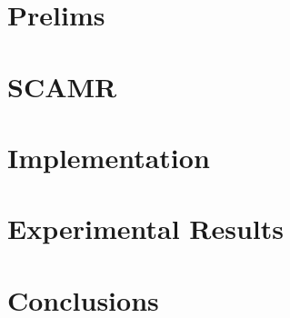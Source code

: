\documentclass{sig-alternate-05-2015}
\begin{document}
\section{Prelims}
\label{sec:prelims}


\section{SCAMR}
\label{sec:scamr}


\section{Implementation}
\label{sec:impl}


\section{Experimental Results}
\label{sec:res}


\section{Conclusions}
\label{sec:concl}




\end{document}
